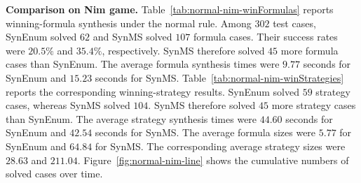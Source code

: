 \documentclass[review]{elsarticle}
\begin{document}
{\color{red}
\textbf{Comparison on Nim game.}
Table~\ref{tab:normal-nim-winFormulas} reports winning-formula synthesis under the normal rule.
Among $302$ test cases, SynEnum solved $62$ and SynMS solved $107$ formula cases.
Their success rates were $20.5\%$ and $35.4\%$, respectively.
SynMS therefore solved $45$ more formula cases than SynEnum.
The average formula synthesis times were $9.77$ seconds for SynEnum and $15.23$ seconds for SynMS.
Table~\ref{tab:normal-nim-winStrategies} reports the corresponding winning-strategy results.
SynEnum solved $59$ strategy cases, whereas SynMS solved $104$.
SynMS therefore solved $45$ more strategy cases than SynEnum.
The average strategy synthesis times were $44.60$ seconds for SynEnum and $42.54$ seconds for SynMS.
The average formula sizes were $5.77$ for SynEnum and $64.84$ for SynMS.
The corresponding average strategy sizes were $28.63$ and $211.04$.
Figure~\ref{fig:normal-nim-line} shows the cumulative numbers of solved cases over time.
}
\end{document}
